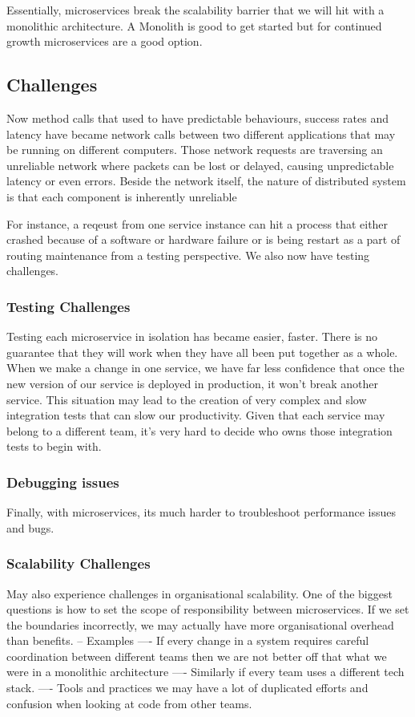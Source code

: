 \documentclass[a4paper, 11pt]{book}
\begin{document}
    Essentially, microservices break the scalability barrier that we will hit with a monolithic architecture. A Monolith is good to get started but for continued growth microservices are a good option.

    \subsection{Challenges}
    Now method calls that used to have predictable behaviours, success rates and latency have became network calls between two different applications that may be running on different computers.
    Those network requests are traversing an unreliable network where packets can be lost or delayed, causing unpredictable latency or even errors.
    Beside the network itself, the nature of distributed system is that each component is inherently unreliable

    For instance, a reqeust from one service instance can hit a process that either crashed because of a software or hardware failure or is being restart as a part of routing maintenance from a testing perspective.
    We also now have testing challenges.
    \subsubsection{Testing Challenges}
    Testing each microservice in isolation has became easier, faster.
    There is no guarantee that they will work when they have all been put together as a whole.
    When we make a change in one service, we have far less confidence that once the new version of our service is deployed in production, it won't break another service.
    This situation may lead to the creation of very complex and slow integration tests that can slow our productivity.
    Given that each service may belong to a different team, it's very hard to decide who owns those integration tests to begin with.

    \subsubsection{Debugging issues}
    Finally, with microservices, its much harder to troubleshoot performance issues and bugs.

    \subsubsection{Scalability Challenges}
    May also experience challenges in organisational scalability.
    One of the biggest questions is how to set the scope of responsibility between microservices.
    If we set the boundaries incorrectly, we may actually have more organisational overhead than benefits.
    -- Examples
    ---- If every change in a system requires careful coordination between different teams then we are not better off that what we were in a monolithic architecture
    ---- Similarly if every team uses a different tech stack.
    ---- Tools and practices we may have a lot of duplicated efforts and confusion when looking at code from other teams.
\end{document}
